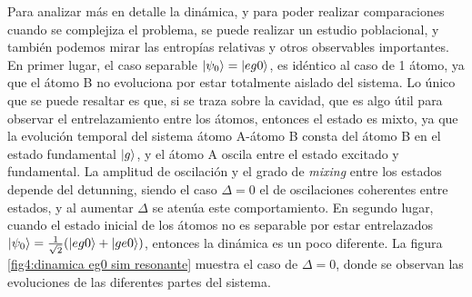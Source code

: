 Para analizar más en detalle la dinámica, y para poder realizar comparaciones cuando se complejiza el problema, se puede realizar un estudio poblacional, y también podemos mirar las entropías relativas y otros observables importantes.
En primer lugar, el caso separable $\ket{\psi_0}=\ket{eg0}$, es idéntico al caso de 1 átomo, ya que el átomo B no evoluciona por estar totalmente aislado del sistema. Lo único que se puede resaltar es que, si se traza sobre la cavidad, que es algo útil para observar el entrelazamiento entre los átomos, entonces el estado es mixto, ya que la evolución temporal del sistema átomo A-átomo B consta del átomo B en el estado fundamental $\ket{g}$, y el átomo A oscila entre el estado excitado y fundamental. La amplitud de oscilación y el grado de \textit{mixing} entre los estados depende del detunning, siendo el caso $\Delta=0$ el de oscilaciones coherentes entre estados, y al aumentar $\Delta$ se atenúa este comportamiento.
En segundo lugar, cuando el estado inicial de los átomos no es separable por estar entrelazados $\ket{\psi_0}=\frac{1}{\sqrt{2}}(\ket{eg0} + \ket{ge0})$, entonces la dinámica es un poco diferente. La figura \ref{fig4:dinamica eg0 sim resonante} muestra el caso de $\Delta=0$, donde se observan las evoluciones de las diferentes partes del sistema.

